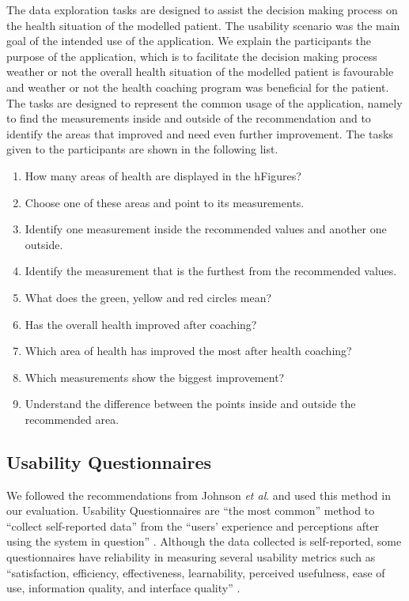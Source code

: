 \documentclass[twocolumn]{bmcart}%
\begin{document}
The data exploration tasks are designed to assist the decision making process on the health situation of the modelled patient. The usability scenario was the main goal of the intended use of the application. We explain the participants the purpose of the application, which is to facilitate the decision making process weather or not the overall health situation of the modelled patient is favourable and weather or not the health coaching program was beneficial for the patient. The tasks are designed to represent the common usage of the application, namely to find the measurements inside and outside of the recommendation and to identify the areas that improved and need even further improvement. The tasks given to the participants are shown in the following list.
\begin{enumerate}
\item How many areas of health are displayed in the hFigures?
\item Choose one of these areas and point to its measurements.
\item Identify one measurement inside the recommended values and another one outside.
\item Identify the measurement that is the furthest from the recommended values.
\item What does the green, yellow and red circles mean?
\item Has the overall health improved after coaching?
\item Which area of health has improved the most after health coaching?
\item Which measurements show the biggest improvement?
\item Understand the difference between the points inside and outside the recommended area.
\end{enumerate}

\subsection*{Usability Questionnaires}

We followed the recommendations from Johnson \textit{et al}. and used this method in our evaluation. Usability Questionnaires are ``the most common'' method to ``collect self-reported data'' from the ``users’ experience and perceptions after using the system in question'' \cite{johnson2011ehr}. Although the data collected is self-reported, some questionnaires have reliability in measuring several usability metrics such as ``satisfaction, efficiency, effectiveness, learnability, perceived usefulness, ease of use, information quality, and interface quality'' \cite{johnson2011ehr}.
\end{document}
